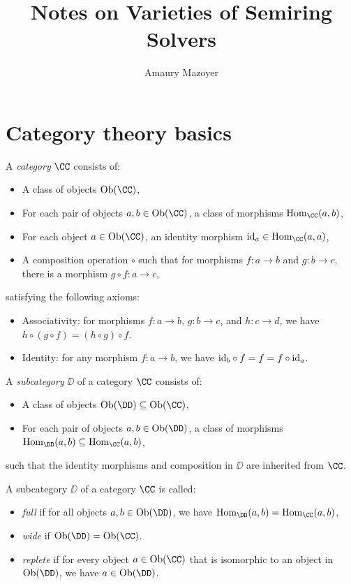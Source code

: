 \documentclass[11pt]{article}
\title{Notes on Varieties of Semiring Solvers}
\author{Amaury Mazoyer}
\begin{document}
\maketitle

\tableofcontents

\newpage

\section{Category theory basics}

\begin{definition}[Category]
  A \emph{category} $\CC$ consists of:
  \begin{itemize}
    \item A class of objects $\Ob(\CC)$,
    \item For each pair of objects $a, b \in \Ob(\CC)$, a class of morphisms $\Hom_{\CC}(a, b)$,
    \item For each object $a \in \Ob(\CC)$, an identity morphism $\id_a \in \Hom_{\CC}(a, a)$,
    \item A composition operation $\circ$ such that for morphisms $f: a \to b$ and $g: b \to c$, there is a morphism $g \circ f: a \to c$,
  \end{itemize}
  satisfying the following axioms:
  \begin{itemize}
    \item Associativity: for morphisms $f: a \to b$, $g: b \to c$, and $h: c \to d$, we have $h \circ (g \circ f) = (h \circ g) \circ f$.
    \item Identity: for any morphism $f: a \to b$, we have $\text{id}_b \circ f = f = f \circ \text{id}_a$.
  \end{itemize}
\end{definition}

\begin{definition}[Subcategory]
  A \emph{subcategory} $\DD$ of a category $\CC$ consists of:
  \begin{itemize}
    \item A class of objects $\Ob(\DD) \subseteq \Ob(\CC)$,
    \item For each pair of objects $a, b \in \Ob(\DD)$, a class of morphisms $\Hom_{\DD}(a, b) \subseteq \Hom_{\CC}(a, b)$,
  \end{itemize}
  such that the identity morphisms and composition in $\DD$ are inherited from $\CC$.
\end{definition}

\begin{definition}
  A subcategory $\DD$ of a category $\CC$ is called:
  \begin{itemize}
    \item \emph{full} if for all objects $a, b \in \Ob(\DD)$, we have $\Hom_{\DD}(a, b) = \Hom_{\CC}(a, b)$,
    \item \emph{wide} if $\Ob(\DD) = \Ob(\CC)$.
    \item \emph{replete} if for every object $a \in \Ob(\CC)$ that is isomorphic to an object in $\Ob(\DD)$, we have $a \in \Ob(\DD)$.
  \end{itemize}
\end{definition}
\end{document}

